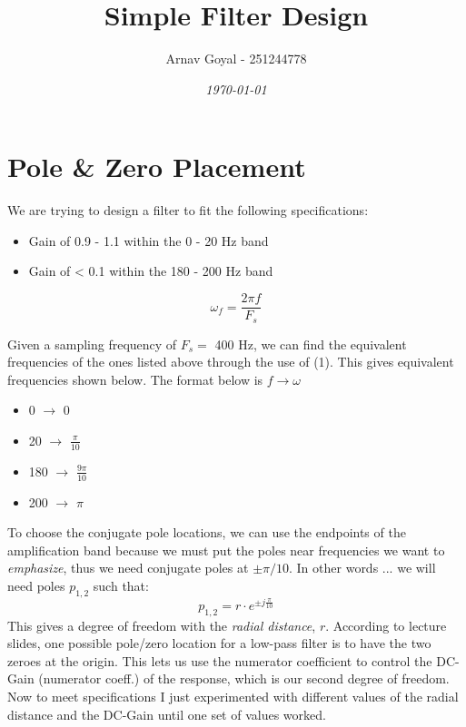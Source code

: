 \documentclass[]{report}
\title{\textbf{Simple Filter Design}}
\date{\textit{\today}}
\author{Arnav Goyal - 251244778}
\begin{document}
	
\maketitle

\section*{Pole \& Zero Placement}

We are trying to design a filter to fit the following specifications:

\begin{itemize}
	\item Gain of 0.9 - 1.1 within the 0 - 20 Hz band
	\item Gain of < 0.1 within the 180 - 200 Hz band
\end{itemize}

\begin{equation}
	\omega_f = \frac{2\pi f}{F_s}
\end{equation}

Given a sampling frequency of $F_s=$ 400 Hz, we can find the equivalent frequencies of the ones listed above through the use of (1).
This gives equivalent frequencies shown below. The format below is $f \rightarrow \omega$

\begin{itemize}
	\item 0 	$\rightarrow$ 0 
	\item 20  	$\rightarrow$ $\frac{\pi}{10}$ 
	\item 180 	$\rightarrow$ $\frac{9\pi}{10}$ 
	\item 200  	$\rightarrow$ $\pi$ 
\end{itemize}

To choose the conjugate pole locations, we can use the endpoints of the amplification band because we must put the poles near frequencies we want to \textit{emphasize}, thus we need conjugate poles at $\pm\pi/10$. In other words ... we will need poles $p_{1,2}$ such that:
	\[ p_{1,2} = r\cdot e^{\pm j \frac{\pi}{10}}	\]
This gives a degree of freedom with the \textit{radial distance}, $r$. According to lecture slides, one possible pole/zero location for a low-pass filter is to have the two zeroes at the origin. This lets us use the numerator coefficient to control the DC-Gain (numerator coeff.) of the response, which is our second degree of freedom. Now to meet specifications I just experimented with different values of the radial distance and the DC-Gain until one set of values worked. 
\end{document}
